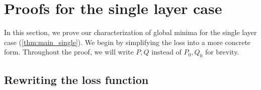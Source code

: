 \documentclass{article}
\begin{document}
\newpage

\appendix
\renewcommand{\appendixpagename}{\centering \LARGE Appendix}
\appendixpage

\startcontents[section]

\newcommand{\proofstep}[2]{{\large \textbf{Step #1:  #2}}\\}

\section{Proofs for the single layer case}
\label{sec:single_proofs}

In this section, we prove our characterization of global minima for the single layer case (\autoref{thm:main_single}).
We begin by simplifying the loss into a more concrete form.
Throughout the proof, we will  write $P,Q$ instead of $P_0,Q_0$ for brevity.

\subsection{Rewriting the loss function}
\label{sec:rewrite loss}
\end{document}
